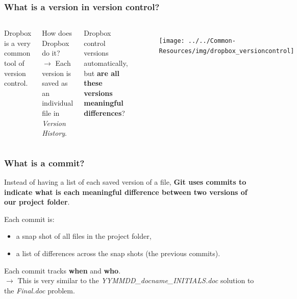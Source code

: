\documentclass[aspectratio=169]{beamer} %
\begin{document}
\begin{frame}
\frametitle{What is a version in version control?}

	\begin{columns}[c]

		Dropbox is a very common tool of version control.
		
		\vspace{.5cm}
		
		How does Dropbox do it? \\
		$\rightarrow$ Each version is saved as an individual file in \textit{Version History}.
		
		\vspace{.5cm}
		
		Dropbox control versions automatically, but \textbf{are all these versions meaningful differences}?

		\begin{figure}
			\centering
			\texttt{[image: ../../Common-Resources/img/dropbox\_versioncontrol]}
			\label{fig:dropboxversioncontrol}
		\end{figure}

	\end{columns}


\end{frame}

\begin{frame}
\frametitle{What is a commit?}

	Instead of having a list of each saved version of a file, \textbf{Git uses commits to indicate what is each meaningful difference between two versions of our project folder}.

	\vspace{.25cm}

	Each commit is: 
	\begin{itemize}
		\item a snap shot of all files in the project folder,
		\item a list of differences across the snap shots (the previous commits).
	\end{itemize}

	\vspace{.25cm}

	Each commit tracks \textbf{when} and \textbf{who}. \\
	{\small $\rightarrow$ This is very similar to the \textit{YYMMDD\_docname\_INITIALS.doc} solution to the \textit{Final.doc} problem.} 

\end{frame}
\end{document}
